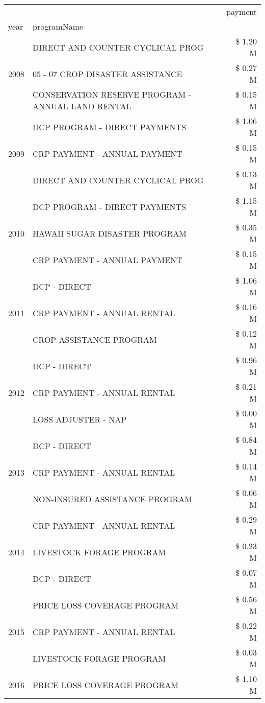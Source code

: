 \begin{tabular}{llr}
\toprule
 &  & payment \\
year & programName &  \\
\midrule
\multirow[t]{3}{*}{2008} & DIRECT AND COUNTER CYCLICAL PROG & \$ 1.20 M \\
 & 05 - 07 CROP DISASTER ASSISTANCE & \$ 0.27 M \\
 & CONSERVATION RESERVE PROGRAM - ANNUAL LAND RENTAL & \$ 0.15 M \\
\cline{1-3}
\multirow[t]{3}{*}{2009} & DCP PROGRAM - DIRECT PAYMENTS & \$ 1.06 M \\
 & CRP PAYMENT - ANNUAL PAYMENT & \$ 0.15 M \\
 & DIRECT AND COUNTER CYCLICAL PROG & \$ 0.13 M \\
\cline{1-3}
\multirow[t]{3}{*}{2010} & DCP PROGRAM - DIRECT PAYMENTS & \$ 1.15 M \\
 & HAWAII SUGAR DISASTER PROGRAM & \$ 0.35 M \\
 & CRP PAYMENT - ANNUAL PAYMENT & \$ 0.15 M \\
\cline{1-3}
\multirow[t]{3}{*}{2011} & DCP - DIRECT & \$ 1.06 M \\
 & CRP PAYMENT - ANNUAL RENTAL & \$ 0.16 M \\
 & CROP ASSISTANCE PROGRAM & \$ 0.12 M \\
\cline{1-3}
\multirow[t]{3}{*}{2012} & DCP - DIRECT & \$ 0.96 M \\
 & CRP PAYMENT - ANNUAL RENTAL & \$ 0.21 M \\
 & LOSS ADJUSTER - NAP & \$ 0.00 M \\
\cline{1-3}
\multirow[t]{3}{*}{2013} & DCP - DIRECT & \$ 0.84 M \\
 & CRP PAYMENT - ANNUAL RENTAL & \$ 0.14 M \\
 & NON-INSURED ASSISTANCE PROGRAM & \$ 0.06 M \\
\cline{1-3}
\multirow[t]{3}{*}{2014} & CRP PAYMENT - ANNUAL RENTAL & \$ 0.29 M \\
 & LIVESTOCK FORAGE PROGRAM & \$ 0.23 M \\
 & DCP - DIRECT & \$ 0.07 M \\
\cline{1-3}
\multirow[t]{3}{*}{2015} & PRICE LOSS COVERAGE PROGRAM & \$ 0.56 M \\
 & CRP PAYMENT - ANNUAL RENTAL & \$ 0.22 M \\
 & LIVESTOCK FORAGE PROGRAM & \$ 0.03 M \\
\cline{1-3}
\multirow[t]{3}{*}{2016} & PRICE LOSS COVERAGE PROGRAM                   & \$ 1.10 M \\

\end{tabular}
